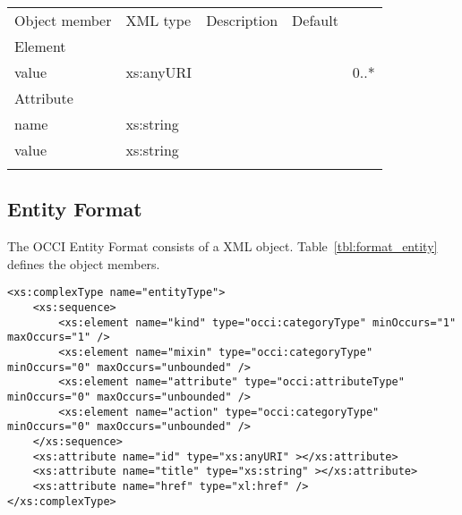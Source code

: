 \documentclass[10pt,a4paper]{article}
\begin{document}
 {
    \begin{tabularx}{\textwidth}{llXll}
    \toprule
    Object member & XML type & Description & Default \\
    \colrule
    Element \\
    value & xs:anyURI & & & 0..* \\
    Attribute\\
    name & xs:string \\
    value & xs:string \\


    \botrule
    \end{tabularx}
}

\subsection{Entity Format}
\label{sec:format_entity}

The OCCI Entity Format consists of a XML object.
Table~\ref{tbl:format_entity} defines the object members.

\begin{lstlisting}
<xs:complexType name="entityType">
	<xs:sequence>
		<xs:element name="kind" type="occi:categoryType" minOccurs="1" maxOccurs="1" />
		<xs:element name="mixin" type="occi:categoryType" minOccurs="0" maxOccurs="unbounded" />
		<xs:element name="attribute" type="occi:attributeType" minOccurs="0" maxOccurs="unbounded" />
		<xs:element name="action" type="occi:categoryType" minOccurs="0" maxOccurs="unbounded" />
	</xs:sequence>
	<xs:attribute name="id" type="xs:anyURI" ></xs:attribute>
	<xs:attribute name="title" type="xs:string" ></xs:attribute>
	<xs:attribute name="href" type="xl:href" />
</xs:complexType>
\end{lstlisting}
\end{document}
